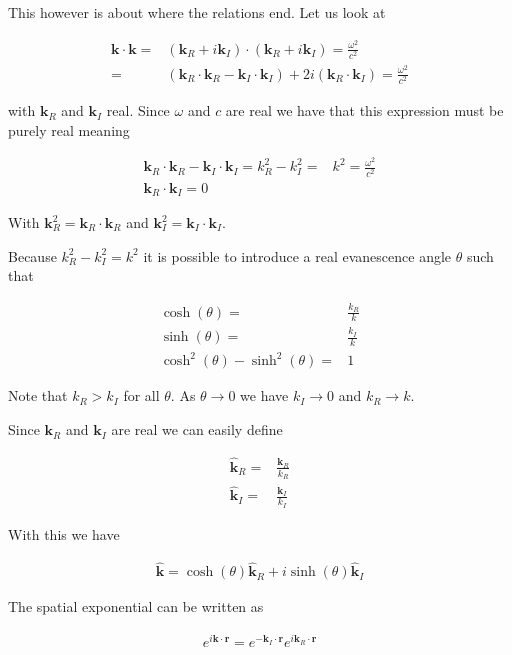 \documentclass[12pt]{article}
\renewcommand{\vec}[1]{\boldsymbol{#1}}
\newcommand{\unitvec}[1]{\hat{\boldsymbol{#1}}}
\begin{document}
This however is about where the relations end.
Let us look at

\begin{align}
\vec{k}\cdot\vec{k} =& \left(\vec{k}_R + i\vec{k}_I\right)\cdot\left(\vec{k}_R + i\vec{k}_I\right) = \frac{\omega^2}{c^2}\\
=& \left(\vec{k}_R\cdot\vec{k}_R - \vec{k}_I\cdot\vec{k}_I\right) + 2i\left(\vec{k}_R\cdot\vec{k}_I\right) = \frac{\omega^2}{c^2}
\end{align}

with $\vec{k}_R$ and $\vec{k}_I$ real.
Since $\omega$ and $c$ are real we have that this expression must be purely real meaning

\begin{align}
\vec{k}_R\cdot\vec{k}_R - \vec{k}_I\cdot\vec{k}_I = k_R^2 - k_I^2 =& k^2 = \frac{\omega^2}{c^2}\\
\vec{k}_R\cdot\vec{k}_I = 0
\end{align}

With $\vec{k}_R^2 = \vec{k}_R\cdot\vec{k}_R$ and $\vec{k}_I^2 = \vec{k}_I\cdot\vec{k}_I$.

Because $k_R^2 - k_I^2 = k^2$ it is possible to introduce a real evanescence angle $\theta$ such that

\begin{align}
\cosh(\theta) =& \frac{k_R}{k}\\
\sinh(\theta) =& \frac{k_I}{k}\\
\cosh^2(\theta) - \sinh^2(\theta) =& 1
\end{align}

Note that $k_R>k_I$ for all $\theta$.
As $\theta\rightarrow 0$ we have $k_I \rightarrow 0$ and $k_R \rightarrow k$.

Since $\vec{k}_R$ and $\vec{k}_I$ are real we can easily define

\begin{align}
\unitvec{k}_R =& \frac{\vec{k}_R}{k_R}\\
\unitvec{k}_I =& \frac{\vec{k}_I}{k_I}
\end{align}

With this we have

\begin{align}
\unitvec{k} = \cosh(\theta) \unitvec{k}_R + i \sinh(\theta)\unitvec{k}_I
\end{align}

The spatial exponential can be written as

\begin{align}
e^{i\vec{k}\cdot\vec{r}} = e^{-\vec{k}_I\cdot\vec{r}}e^{i\vec{k}_R\cdot\vec{r}}
\end{align}
\end{document}
